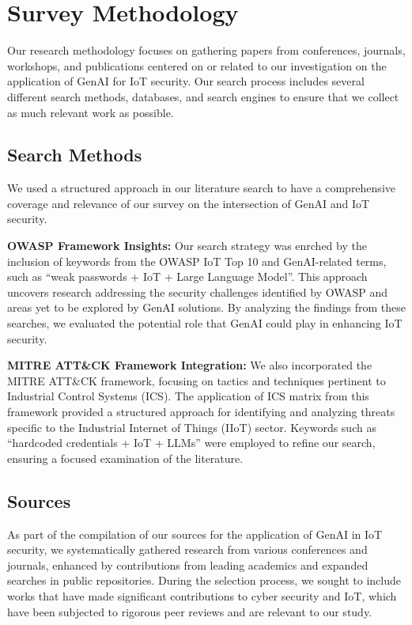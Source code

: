\section{Survey Methodology}
\label{sec:search-method}
%
Our research methodology focuses on gathering papers from conferences, journals, workshops, and publications centered on or related to our investigation on the application of GenAI for IoT security. Our search process includes several different search methods, databases, and search engines to ensure that we collect as much relevant work as possible.
%
\subsection{Search Methods}
%
We used a structured approach in our literature search to have a comprehensive coverage and relevance of our survey on the intersection of GenAI and IoT security.

\smallskip
\textbf{OWASP Framework Insights:} Our search strategy was enrched by the inclusion of keywords from the OWASP IoT Top 10 and GenAI-related terms, such as ``weak passwords + IoT + Large Language Model''.
This approach uncovers research addressing the security challenges identified by OWASP and areas yet to be explored by GenAI solutions.
By analyzing the findings from these searches, we evaluated the potential role that GenAI could play in enhancing IoT security.

\smallskip
\textbf{MITRE ATT\&CK Framework Integration:} We also incorporated the MITRE ATT\&CK framework, focusing on tactics and techniques pertinent to Industrial Control Systems (ICS).
The application of ICS matrix from this framework provided a structured approach for identifying and analyzing threats specific to the Industrial Internet of Things (IIoT) sector.
Keywords such as ``hardcoded credentials + IoT + LLMs'' were employed to refine our search, ensuring a focused examination of the literature.
%
\subsection{Sources}
%
As part of the compilation of our sources for the application of GenAI in IoT security, we systematically gathered research from various conferences and journals, enhanced by contributions from leading academics and expanded searches in public repositories.
During the selection process, we sought to include works that have made significant contributions to cyber security and IoT, which have been subjected to rigorous peer reviews and are relevant to our study.

